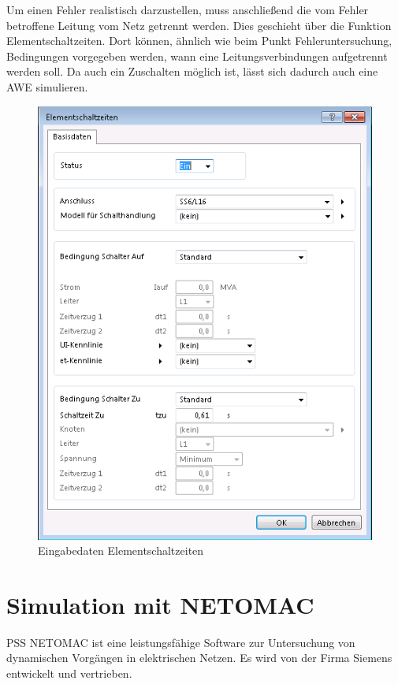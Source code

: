 \documentclass{scrartcl}
\begin{document}
\begin{onehalfspace}
Um einen Fehler realistisch darzustellen, muss anschließend die vom Fehler betroffene Leitung vom Netz getrennt werden. Dies geschieht über die Funktion \glqq Elementschaltzeiten\grqq. Dort können, ähnlich wie beim Punkt Fehleruntersuchung, Bedingungen vorgegeben werden, wann eine Leitungsverbindungen aufgetrennt werden soll. Da auch ein Zuschalten möglich ist, lässt sich dadurch auch eine AWE simulieren.

	\begin{figure}[H]
	\centering
	\includegraphics[scale=0.4]{img/elementschaltzeiten.png}
	\caption{Eingabedaten Elementschaltzeiten}
	\end{figure}

\section{Simulation mit NETOMAC}
PSS NETOMAC ist eine leistungsfähige Software zur Untersuchung von dynamischen Vorgängen in elektrischen Netzen. Es wird von der Firma Siemens entwickelt und vertrieben.


\end{onehalfspace}
\end{document}
